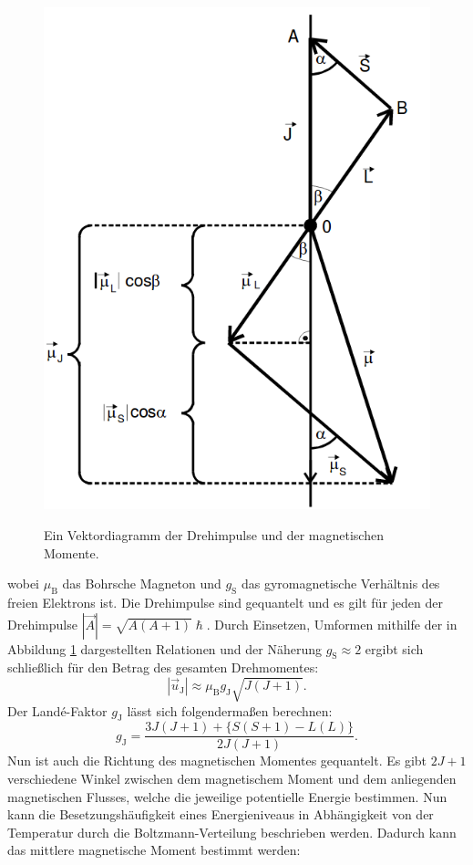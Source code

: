 \begin{figure}
	\centering
	\caption{Ein Vektordiagramm der Drehimpulse und der magnetischen Momente.}
	\includegraphics[width=\linewidth-70pt,height=\textwidth-200pt,keepaspectratio]{content/images/Vektordiagramm.png}
	\label{fig:Vektordiagramm}
\end{figure}
wobei $\mu_\text{B}$ das Bohrsche Magneton und $g_\text{S}$ das gyromagnetische Verhältnis des freien Elektrons ist. Die Drehimpulse sind gequantelt und es gilt für jeden der Drehimpulse $|\vec{A}|= \sqrt{A(A+1)} \hslash$. Durch Einsetzen, Umformen mithilfe der in Abbildung \ref{fig:Vektordiagramm} dargestellten Relationen und der Näherung $g_\text{S}\approx 2$ ergibt sich schließlich für den Betrag des gesamten Drehmomentes:
\begin{equation}
	|\vec{u}_\text{J}|\approx \mu_\text{B} g_\text{J} \sqrt{J(J+1)} \text{.}
\end{equation}
Der Landé-Faktor $g_\text{J}$ lässt sich folgendermaßen berechnen:
\begin{equation}
	g_\text{J}=\frac{3 J(J+1) + \{S(S+1) - L(L)\}}{2 J(J+1)}\text{.}\label{eq:g_J}
\end{equation}
Nun ist auch die Richtung des magnetischen Momentes gequantelt. Es gibt $2 J +1$ verschiedene Winkel zwischen dem magnetischem Moment und dem anliegenden magnetischen Flusses, welche die jeweilige potentielle Energie bestimmen. Nun kann die Besetzungshäufigkeit eines Energieniveaus in Abhängigkeit von der Temperatur durch die Boltzmann-Verteilung beschrieben werden. Dadurch kann das mittlere magnetische Moment bestimmt werden:
